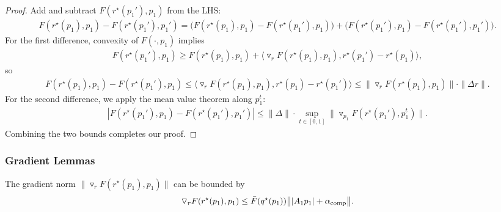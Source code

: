 \begin{proof}
Add and subtract $F(r^\star(p_1'),p_1)$ from the LHS:
\begin{align*}
F(r^\star(p_1),p_1)-F(r^\star(p_1'),p_1')
=
\big(F(r^\star(p_1),p_1)-F(r^\star(p_1'),p_1)\big)
+
\big(F(r^\star(p_1'),p_1)-F(r^\star(p_1'),p_1')\big).
\end{align*}
For the first difference, convexity of $F(\cdot,p_1)$ implies
\begin{align*}
F(r^\star(p_1'),p_1)\ge F(r^\star(p_1),p_1)+\langle \triangledown_r F(r^\star(p_1),p_1), r^\star(p_1')-r^\star(p_1)\rangle,
\end{align*}
so
\begin{align*}
F(r^\star(p_1),p_1)-F(r^\star(p_1'),p_1)
\le
\langle \triangledown_r F(r^\star(p_1),p_1), r^\star(p_1)-r^\star(p_1')\rangle
\le
\|\triangledown_r F(r^\star(p_1),p_1)\|\cdot \|\Delta r\|.
\end{align*}
For the second difference, we apply the mean value theorem along $p_1^t$:
\begin{align*}
|F(r^\star(p_1'),p_1)-F(r^\star(p_1'),p_1')|
\le
\|\Delta\|\cdot \sup_{t\in[0,1]}\|\triangledown_{p_1}F(r^\star(p_1'),p_1^t)\|.
\end{align*}
Combining the two bounds completes our proof.
\end{proof}


\subsubsection{Gradient Lemmas}

\begin{lemma} \label{lemma:grad_r}
    The gradient norm $\|\triangledown_r F(r^\star(p_1),p_1)\|$ can be bounded by 
    \begin{align*}
        \triangledown_r F(r^\star(p_1), p_1) \le \bar{F}(q^\star(p_1))  \big\| | A_1 p_1 | + \alpha_{\text{comp}} \big\|.
    \end{align*}
\end{lemma}


